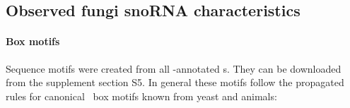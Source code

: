 %

\subsection{Observed fungi snoRNA characteristics}

\paragraph{\textbf{Box motifs}} Sequence motifs were created from all
\snostrip-annotated \sno s. They can be downloaded from the
supplement section S5.  In general these motifs follow the propagated rules for
canonical \sno\ box motifs known from yeast and animals:

